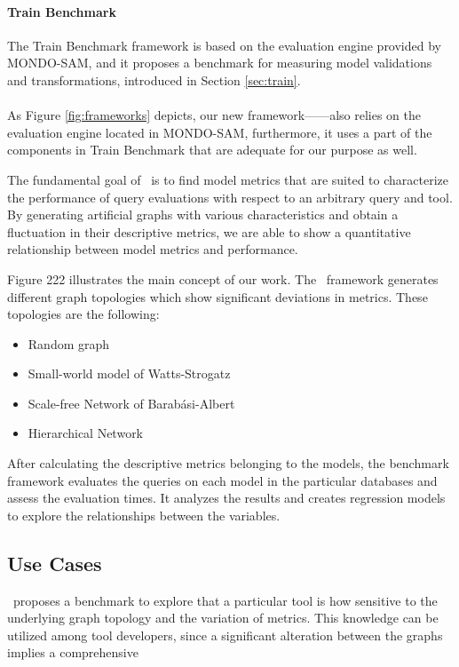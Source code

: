 \paragraph{Train Benchmark}
The Train Benchmark framework is based on the evaluation engine provided by MONDO-SAM, and it proposes a benchmark for measuring model validations and transformations, introduced in Section \ref{sec:train}.

\paragraph{\framework}
As Figure \ref{fig:frameworks} depicts, our new framework---\framework---also relies on the evaluation engine located in MONDO-SAM, furthermore, it uses a part of the components in Train Benchmark that are adequate for our purpose as well.


The fundamental goal of \framework~is to find model metrics that are suited to characterize the performance of query evaluations with respect to an arbitrary query and tool. By generating artificial graphs with various characteristics and obtain a fluctuation in their descriptive metrics, we are able to show a quantitative relationship between model metrics and performance.

Figure 222 illustrates the main concept of our work. The \framework~framework generates different graph topologies which show significant deviations in metrics. These topologies are the following:
\begin{itemize}
	\item Random graph
	\item Small-world model of Watts-Strogatz
	\item Scale-free Network of Barabási-Albert
	\item Hierarchical Network
\end{itemize}
After calculating the descriptive metrics belonging to the models, the benchmark framework evaluates the queries on each model in the particular databases and assess the evaluation times. It analyzes the results and creates regression models to explore the relationships between the variables.

\subsection{Use Cases}

\framework~proposes a benchmark to explore that a particular tool is how sensitive to the underlying graph topology and the variation of metrics. This knowledge can be utilized among tool developers, since a significant alteration between the graphs implies a comprehensive

